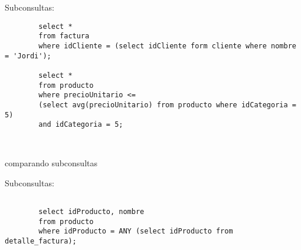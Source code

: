 Subconsultas: 

\begin{example}
	\begin{verbatim}
		select *
		from factura
		where idCliente = (select idCliente form cliente where nombre = 'Jordi');
		
		select *
		from producto 
		where precioUnitario <= 
		(select avg(precioUnitario) from producto where idCategoria = 5)
		and idCategoria = 5;
		
		
	\end{verbatim}
\end{example}

comparando subconsultas

Subconsultas: 

\begin{example}
	\begin{verbatim}
		
		select idProducto, nombre
		from producto
		where idProducto = ANY (select idProducto from detalle_factura);
		
		
	\end{verbatim}
\end{example}